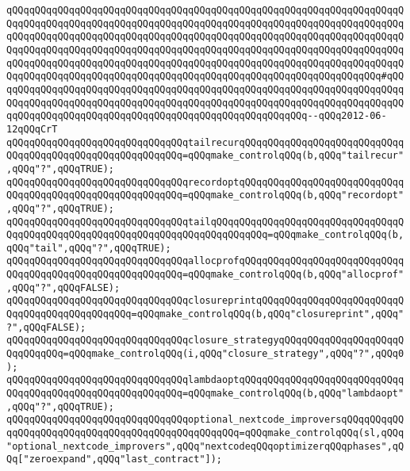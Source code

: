 \verb|qQQqqQQqqQQqqQQqqQQqqQQqqQQqqQQqqQQqqQQqqQQqqQQqqQQqqQQqqQQqqQQqqQQqqQQqqQQqqQQqqQQqqQQqqQQqqQQqqQQqqQQqqQQqqQQqqQQqqQQqqQQqqQQqqQQqqQQqqQQqqQQqqQQqqQQqqQQqqQQqqQQqqQQqqQQqqQQqqQQqqQQqqQQqqQQqqQQqqQQqqQQqqQQqqQQqqQQqqQQqqQQqqQQqqQQqqQQqqQQqqQQqqQQqqQQqqQQqqQQqqQQqqQQqqQQqqQQqqQQqqQQqqQQqqQQqqQQqqQQqqQQqqQQqqQQqqQQqqQQqqQQqqQQqqQQqqQQqqQQqqQQqqQQqqQQqqQQqqQQqqQQqqQQqqQQqqQQqqQQqqQQqqQQqqQQqqQQqqQQqqQQqqQQqqQQqqQQq#qQQqqQQqqQQqqQQqqQQqqQQqqQQqqQQqqQQqqQQqqQQqqQQqqQQqqQQqqQQqqQQqqQQqqQQqqQQqqQQqqQQqqQQqqQQqqQQqqQQqqQQqqQQqqQQqqQQqqQQqqQQqqQQqqQQqqQQqqQQqqQQqqQQqqQQqqQQqqQQqqQQqqQQqqQQqqQQqqQQqqQQqqQQqqQQqqQQq--qQQq2012-06-12qQQqCrT|\newline
\newline
\verb|qQQqqQQqqQQqqQQqqQQqqQQqqQQqqQQqtailrecurqQQqqQQqqQQqqQQqqQQqqQQqqQQqqQQqqQQqqQQqqQQqqQQqqQQqqQQqqQQq=qQQqmake_controlqQQq(b,qQQq"tailrecur",qQQq"?",qQQqTRUE);|\newline
\verb|qQQqqQQqqQQqqQQqqQQqqQQqqQQqqQQqrecordoptqQQqqQQqqQQqqQQqqQQqqQQqqQQqqQQqqQQqqQQqqQQqqQQqqQQqqQQqqQQq=qQQqmake_controlqQQq(b,qQQq"recordopt",qQQq"?",qQQqTRUE);|\newline
\verb|qQQqqQQqqQQqqQQqqQQqqQQqqQQqqQQqtailqQQqqQQqqQQqqQQqqQQqqQQqqQQqqQQqqQQqqQQqqQQqqQQqqQQqqQQqqQQqqQQqqQQqqQQqqQQqqQQq=qQQqmake_controlqQQq(b,qQQq"tail",qQQq"?",qQQqTRUE);|\newline
\newline
\verb|qQQqqQQqqQQqqQQqqQQqqQQqqQQqqQQqallocprofqQQqqQQqqQQqqQQqqQQqqQQqqQQqqQQqqQQqqQQqqQQqqQQqqQQqqQQqqQQq=qQQqmake_controlqQQq(b,qQQq"allocprof",qQQq"?",qQQqFALSE);|\newline
\verb|qQQqqQQqqQQqqQQqqQQqqQQqqQQqqQQqclosureprintqQQqqQQqqQQqqQQqqQQqqQQqqQQqqQQqqQQqqQQqqQQqqQQq=qQQqmake_controlqQQq(b,qQQq"closureprint",qQQq"?",qQQqFALSE);|\newline
\verb|qQQqqQQqqQQqqQQqqQQqqQQqqQQqqQQqclosure_strategyqQQqqQQqqQQqqQQqqQQqqQQqqQQqqQQq=qQQqmake_controlqQQq(i,qQQq"closure_strategy",qQQq"?",qQQq0);|\newline
\newline
\verb|qQQqqQQqqQQqqQQqqQQqqQQqqQQqqQQqlambdaoptqQQqqQQqqQQqqQQqqQQqqQQqqQQqqQQqqQQqqQQqqQQqqQQqqQQqqQQqqQQq=qQQqmake_controlqQQq(b,qQQq"lambdaopt",qQQq"?",qQQqTRUE);|\newline
\newline
\verb|qQQqqQQqqQQqqQQqqQQqqQQqqQQqqQQqoptional_nextcode_improversqQQqqQQqqQQqqQQqqQQqqQQqqQQqqQQqqQQqqQQqqQQqqQQqqQQq=qQQqmake_controlqQQq(sl,qQQq"optional_nextcode_improvers",qQQq"nextcodeqQQqoptimizerqQQqphases",qQQq["zeroexpand",qQQq"last_contract"]);|\newline
